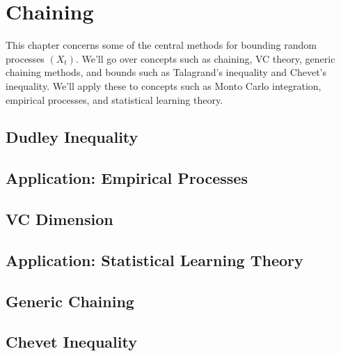 \section{Chaining}
This chapter concerns some of the central methods for bounding random processes $(X_t)$. We'll go over concepts 
such as chaining, VC theory, generic chaining methods, and bounds such as Talagrand's inequality and Chevet's 
inequality. We'll apply these to concepts such as Monto Carlo integration, empirical processes, and statistical 
learning theory.



\subsection{Dudley Inequality}



\subsection{Application: Empirical Processes}



\subsection{VC Dimension}



\subsection{Application: Statistical Learning Theory}



\subsection{Generic Chaining}



\subsection{Chevet Inequality}



